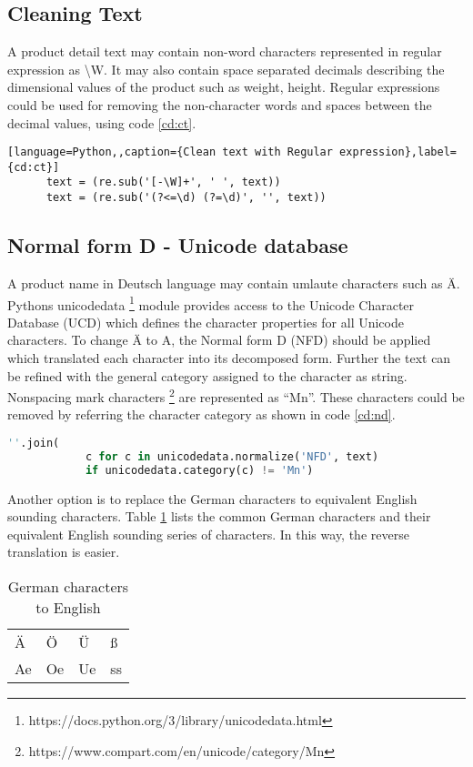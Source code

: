 \subsection{Cleaning Text}
A product detail text may contain non-word characters represented in regular expression as \textbackslash W. It may also contain space separated decimals describing the dimensional values of the product such as weight, height. Regular expressions could be used for removing the non-character words and spaces between the decimal values, using code \ref{cd:ct}. 

\begin{lstlisting}[language=Python,,caption={Clean text with Regular expression},label={cd:ct}]
      text = (re.sub('[-\W]+', ' ', text))
      text = (re.sub('(?<=\d) (?=\d)', '', text))
\end{lstlisting}

\subsection{Normal form D - Unicode database}

A product name in Deutsch language may contain umlaute characters such as \"A.  Pythons unicodedata \footnote{https://docs.python.org/3/library/unicodedata.html} module provides access to the Unicode Character Database (UCD) which defines the character properties for all Unicode characters. To change \"A to A, the Normal form D (NFD) should be applied which translated each character into its decomposed form. Further the text can be refined with the general category assigned to the character as string. Nonspacing mark characters \footnote{https://www.compart.com/en/unicode/category/Mn} are represented as ``Mn''. These characters could be removed by referring the character category as shown in code \ref{cd:nd}.
\begin{lstlisting}[language=Python ,caption={NFD normalization},label={cd:nd}]
      ''.join(
            c for c in unicodedata.normalize('NFD', text)
            if unicodedata.category(c) != 'Mn')
\end{lstlisting}

Another option is to replace the German characters to equivalent English sounding characters. Table \ref{table:deu-eng} lists the common German characters and their equivalent English sounding series of characters. In this way, the reverse translation is easier.
\begin{table}[h]
      \centering
      \caption{German characters to English}
      \label{table:deu-eng}
      \begin{tabular}{ llll }
            \toprule
            \"A& Ö&  Ü&ß \\
            Ae&Oe & Ue&ss\\         
          
            \bottomrule
            \end{tabular}
  \end{table}


